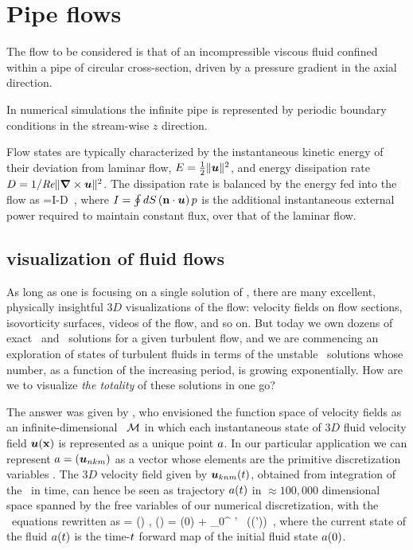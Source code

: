 \documentclass{jfm}
\begin{document}
\section{Pipe flows}
\label{s:review}

The flow to be considered is that of an incompressible viscous fluid
confined within a pipe of circular cross-section, driven by a pressure
gradient in the axial direction.

In numerical simulations the infinite pipe is represented by periodic boundary
conditions in the stream-wise $z$ direction.

Flow states are typically characterized by the instantaneous kinetic
energy of their deviation from laminar flow, $E = \frac{1}{2}
\Norm{\vec{u}}^2$, and energy dissipation rate $D =
1/\Reynolds\Norm{\bnabla \times \vec{u}}^2$. The dissipation rate is
balanced by the energy fed into the flow as
\beq
{}=I-D
\,,
where
\(
I =\oint dS \, ({\bf n}\cdot\vec{u})\, p
\)
is the additional instantaneous external power required to maintain
constant flux, over that of the laminar flow.

\subsection{{\StateDsp} visualization of fluid flows}
\label{s:visualStatSp}

As long as one is focusing on a single solution of \NSe, there are many
excellent, physically insightful $3D$ visualizations of the flow:
velocity fields on flow sections, isovorticity surfaces, videos of the
flow, and so on. But today we own dozens of exact \eqv\ and \reqv\
solutions for a given turbulent flow, and we are commencing an exploration of
states of turbulent fluids in terms of the unstable \po\ solutions whose
number, as a function of the increasing period, is growing exponentially.
How are we to visualize \emph{the totality} of these solutions in one go?

The answer was given by \cite{hopf48}, who envisioned the function space
of {\NS} velocity fields as an infinite-dimensional \statesp\ $\pS$ in
which each instantaneous state of $3D$ fluid velocity field $\vec{u}(\bx)$ is
represented as a unique point $\ssp$. In our particular application we
can represent $\ssp = (\vec{u}_{nkm})$ as a vector whose elements are the
primitive discretization variables \refeq{pipeDiscr}. The $3D$ velocity
field given by $\vec{u}_{knm}(\zeit)$, obtained from integration of the
\NSe\ in time, can hence be seen as trajectory $\ssp(\zeit)$ in
$\approx 100,000$ dimensional space spanned by the free variables of our
numerical discretization, with the \NS\ equations \refeq{NavStokesDev}
rewritten as
\beq
   \dot{\ssp} = \vel(\ssp) ,
   \qquad
   \ssp(\zeit) = \ssp(0)
            + \int_0^\zeit \! \zeit' \, \vel(\ssp(\zeit'))
\,,
where the current state of the fluid $ \ssp(\zeit)$ is the time-$\zeit$
forward map of the initial fluid state  $\ssp(0)$.
\end{document}
